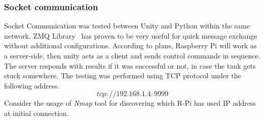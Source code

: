 \subsubsection{Socket communication}
Socket Communication was tested between Unity and Python within the same network.
ZMQ Library~\cite{omq_pyzmq_2019} has proven to be very useful for quick message exchange without additional configurations.
According to plans, Raspberry Pi will work as a server-side, then unity acts as a client and sends control commands in sequence. 
The server responds with results if it was successful or not, in case the tank gets stuck somewhere.
The testing was performed using TCP protocol under the following address.
\begin{equation}
    tcp://192.168.1.4:9999    
\end{equation}
Consider the usage of \textit{Nmap} tool for discovering which R-Pi has used IP address at initial connection.